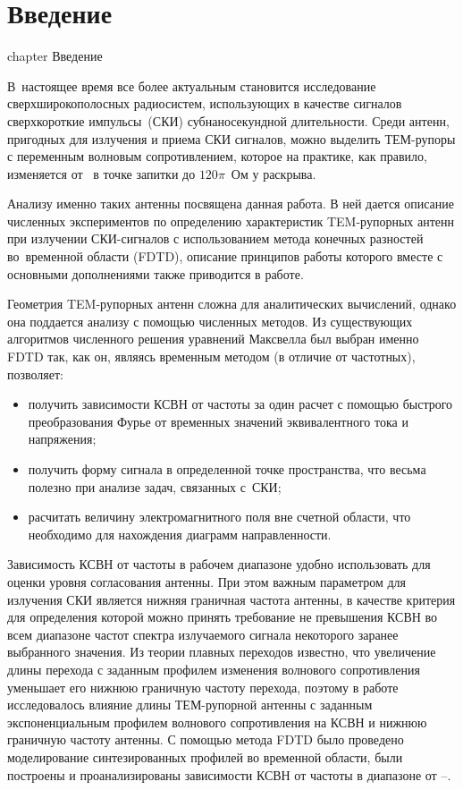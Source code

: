 %
%
%
\chapter* {Введение}
 {chapter} {Введение}

В~настоящее время все более актуальным становится исследование
сверхширокополосных радиосистем, использующих в качестве сигналов сверхкороткие
импульсы~(СКИ) субнаносекундной длительности. Среди антенн, пригодных для излучения
и приема СКИ сигналов, можно выделить ТЕМ-рупоры с переменным волновым
сопротивлением, которое на практике, как правило, изменяется от~
в точке запитки до $120\pi$~Ом у раскрыва.

Анализу именно таких антенны посвящена данная работа. В ней дается описание
численных экспериментов по определению характеристик TEM-рупорных
антенн при излучении СКИ-сигналов с использованием метода конечных разностей
во~временной области (FDTD), описание принципов работы которого вместе
с основными дополнениями также приводится в работе.

Геометрия TEM-рупорных антенн сложна для аналитических вычислений, однако она
поддается анализу с помощью численных методов. Из существующих алгоритмов
численного решения уравнений Максвелла был выбран именно FDTD так, как он,
являясь временным методом (в отличие от частотных), позволяет:
\begin{itemize}
\item получить зависимости КСВН от частоты за один расчет с помощью быстрого
      преобразования Фурье от временных значений эквивалентного тока
      и напряжения;
\item получить форму сигнала в определенной точке пространства, что весьма
      полезно при анализе задач, связанных с~СКИ;
\item расчитать величину электромагнитного поля вне счетной области, что необходимо
      для нахождения диаграмм направленности.
\end{itemize}

Зависимость КСВН от частоты в рабочем диапазоне удобно использовать для оценки
уровня согласования антенны. При этом важным параметром для излучения СКИ
является нижняя граничная частота антенны, в качестве критерия для определения
которой можно принять требование не превышения КСВН во всем диапазоне частот
спектра излучаемого сигнала некоторого заранее выбранного значения.
Из теории плавных переходов известно, что
увеличение длины перехода с заданным профилем изменения волнового сопротивления
уменьшает его нижнюю граничную частоту перехода, поэтому в работе исследовалось
влияние длины ТЕМ-рупорной антенны с заданным экспоненциальным профилем
волнового сопротивления на КСВН и нижнюю граничную частоту антенны. С помощью
метода FDTD было проведено моделирование синтезированных профилей во временной
области, были построены и проанализированы зависимости КСВН от частоты
в диапазоне от --.

